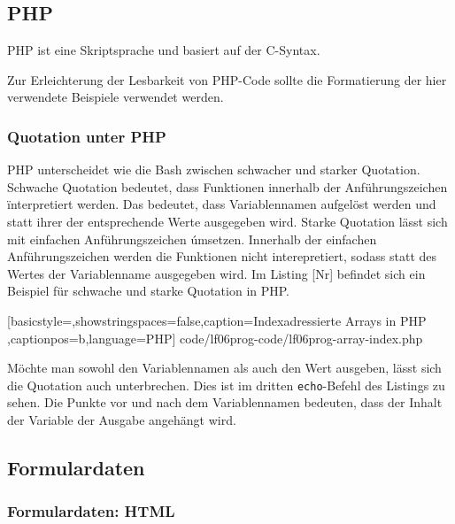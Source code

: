 \subsection{PHP}

PHP ist eine Skriptsprache und basiert auf der C-Syntax.

Zur Erleichterung der Lesbarkeit von PHP-Code sollte die Formatierung der hier verwendete Beispiele verwendet werden.

\subsubsection{Quotation unter PHP}

PHP unterscheidet wie die Bash zwischen schwacher und starker Quotation. Schwache Quotation bedeutet, dass Funktionen innerhalb der Anführungszeichen \" interpretiert werden. Das bedeutet, dass Variablennamen aufgelöst werden und statt ihrer der entsprechende Werte ausgegeben wird. Starke Quotation lässt sich mit einfachen Anführungszeichen \' umsetzen. Innerhalb der einfachen Anführungszeichen werden die Funktionen nicht interepretiert, sodass statt des Wertes der Variablenname ausgegeben wird. Im Listing [Nr] befindet sich ein Beispiel für schwache und starke Quotation in PHP.


	[basicstyle=\small,showstringspaces=false,caption={Indexadressierte Arrays in PHP}
	\label{lst:array-index},captionpos=b,language=PHP]
	{code/lf06prog-code/lf06prog-array-index.php}
	
Möchte man sowohl den Variablennamen als auch den Wert ausgeben, lässt sich die Quotation auch unterbrechen. Dies ist im dritten \texttt{echo}-Befehl des Listings zu sehen. Die Punkte vor und nach dem Variablennamen bedeuten, dass der Inhalt der Variable der Ausgabe angehängt wird.


\subsection{Formulardaten}

\subsubsection{Formulardaten: HTML}

